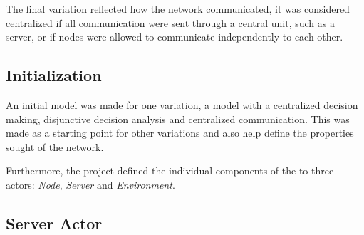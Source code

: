 The final variation reflected how the network communicated, it was considered centralized if all communication were sent through a central unit, such as a server, or if nodes were allowed to communicate independently to each other.

\subsection{Initialization}

An initial model was made for one variation, a model with a centralized decision making, disjunctive decision analysis and centralized communication. This was made as a starting point for other variations and also help define the properties sought of the network.



Furthermore, the project defined the individual components of the \wsn to three actors: \textit{Node}, \textit{Server} and \textit{Environment}.






\subsection{Server Actor}

